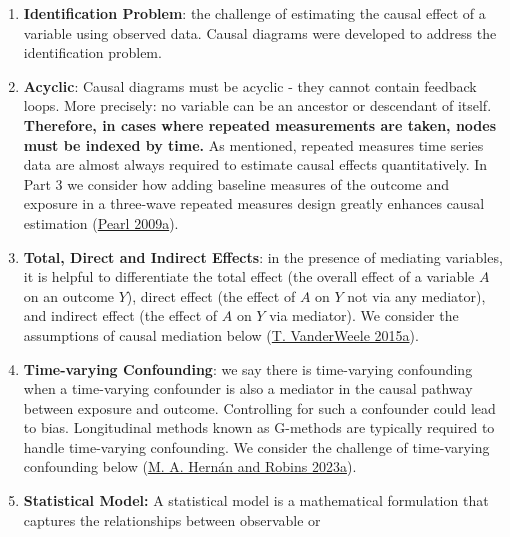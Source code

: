 \documentclass[
  singlecolumn]{article}
\begin{document}
\begin{enumerate}
  a specific set of variables. The backdoor criterion guides the
  selection of variables for adjustment to avoid confounding
  (\protect\hyperlink{ref-pearl1995}{Pearl 1995}).\footnote{Note there
    is also a Front-Door Criterion, which provides another way to
    estimate causal effects, even in the presence of unmeasured
    confounding variables. It relies on identifying a variable (or set
    of variables) that mediates the entire effect of the treatment on
    the outcome. The front-door criterion is rarely used in practice.}
\item
  \textbf{Identification Problem}: the challenge of estimating the
  causal effect of a variable using observed data. Causal diagrams were
  developed to address the identification problem.
\item
  \textbf{Acyclic}: Causal diagrams must be acyclic - they cannot
  contain feedback loops. More precisely: no variable can be an ancestor
  or descendant of itself. \textbf{Therefore, in cases where repeated
  measurements are taken, nodes must be indexed by time.} As mentioned,
  repeated measures time series data are almost always required to
  estimate causal effects quantitatively. In Part 3 we consider how
  adding baseline measures of the outcome and exposure in a three-wave
  repeated measures design greatly enhances causal estimation
  (\protect\hyperlink{ref-pearl2009}{Pearl 2009a}).
\item
  \textbf{Total, Direct and Indirect Effects}: in the presence of
  mediating variables, it is helpful to differentiate the total effect
  (the overall effect of a variable \(A\) on an outcome \(Y\)), direct
  effect (the effect of \(A\) on \(Y\) not via any mediator), and
  indirect effect (the effect of \(A\) on \(Y\) via mediator). We
  consider the assumptions of causal mediation below
  (\protect\hyperlink{ref-vanderweele2015a}{T. VanderWeele 2015a}).
\item
  \textbf{Time-varying Confounding}: we say there is time-varying
  confounding when a time-varying confounder is also a mediator in the
  causal pathway between exposure and outcome. Controlling for such a
  confounder could lead to bias. Longitudinal methods known as G-methods
  are typically required to handle time-varying confounding. We consider
  the challenge of time-varying confounding below
  (\protect\hyperlink{ref-hernuxe1n2023}{M. A. Hernán and Robins
  2023a}).
\item
  \textbf{Statistical Model:} A statistical model is a mathematical
  formulation that captures the relationships between observable or

\end{enumerate}
\end{document}
